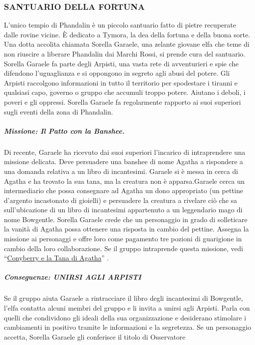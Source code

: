 \documentclass{article}
\begin{document}
\subsubsection{SANTUARIO DELLA FORTUNA}
\hypertarget{santuario}{}
L'unico tempio di Phandalin è un piccolo santuario fatto di
pietre recuperate dalle rovine vicine. È dedicato a Tymora, la
dea della fortuna e della buona sorte.
Una dotta accolita chiamata Sorella Garaele, una zelante
giovane elfa che teme di non riuscire a liberare Phandalin dai
Marchi Rossi, si prende cura del santuario. Sorella Garaele
fa parte degli Arpisti, una vasta rete di avventurieri e spie che
difendono l'uguaglianza e si oppongono in segreto agli abusi
del potere. Gli Arpisti raccolgono informazioni in tutto il
territorio per spodestare i tiranni e qualsiasi capo, governo o
gruppo che accumuli troppo potere. Aiutano i deboli, i poveri
e gli oppressi. Sorella Garaele fa regolarmente rapporto ai
suoi superiori sugli eventi della zona di Phandalin.
\subparagraph{Missione: Il Patto con la Banshee.}
Di recente, Garaele
ha ricevuto dai suoi superiori l’incarico di intraprendere una
missione delicata. Deve persuadere una banshee di nome
Agatha a rispondere a una domanda relativa a un libro di
incantesimi. Garaele si è messa in cerca di Agatha e ha
trovato la sua tana, ma la creatura non è apparsa.Garaele cerca un intermediario che possa consegnare ad
Agatha un dono appropriato (un pettine d'argento incastonato
di gioielli) e persuadere la creatura a rivelare ciò che sa
sull’ubicazione di un libro di incantesimi appartenuto a un
leggendario mago di nome Bowgentle. Sorella Garaele crede
che un personaggio in grado di solleticare la vanità di Agatha
possa ottenere una risposta in cambio del pettine. Assegna
la missione ai personaggi e offre loro come pagamento tre
pozioni di guarigione in cambio della loro collaborazione. Se
il gruppo intraprende questa missione, vedi “\hyperlink{agatha}{Conyberry e la
Tana di Agatha}” .
\subparagraph{Conseguenze: UNIRSI AGLI ARPISTI }
Se il gruppo aiuta Garaele a rintracciare il libro degli
incantesimi di Bowgentle, l’elfa contatta alcuni membri del
gruppo e li invita a unirsi agli Arpisti. Parla con quelli che
condividono gli ideali della sua organizzazione e desiderano
stimolare i cambiamenti in positivo tramite le informazioni e
la segretezza. Se un personaggio accetta, Sorella Garaele gli
conferisce il titolo di Osservatore
\end{document}

